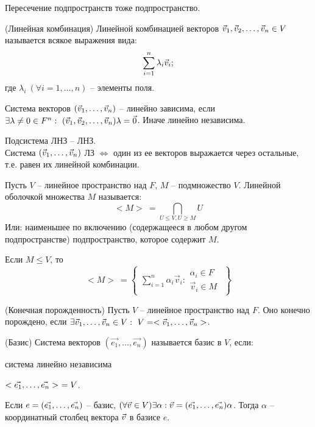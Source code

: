 \begin{multicols}{2}
\begin{note}{}{}
    Пересечение подпространств тоже подпространство.
\end{note}
\begin{definition}{(Линейная комбинация)}{}
    Линейной комбинацией векторов $\vec{v}_1, \vec{v}_2, \ldots, \vec{v}_n\in V$ называется всякое выражения вида:\useshortskip
    \[
        \sum\limits_{i=1}^n \lambda_i \vec{v}_i;
        \]
    где $\lambda_i \ (\forall i = 1, \ldots, n)$ -- элементы поля.
\end{definition}
Система векторов $(\vec{v}_1, \ldots, \vec{v}_n)$ -- линейно зависима, если $\exists \lambda\neq 0 \in F^n: \ (\vec{v}_1, \vec{v}_2,\ldots, \vec{v}_n)\lambda = \vec{0}$. Иначе линейно независима.\vspace*{0.5cm}

\begin{note}{}{}
    Подсистема ЛНЗ -- ЛНЗ. \\Система $(\vec{v}_1, \ldots, \vec{v}_n)$ ЛЗ $\Longleftrightarrow$ один из ее векторов выражается через остальные, т.е. равен их линейной комбинации.
\end{note}
\begin{definition}{}{}
    Пусть $V$ -- линейное пространство над $F$, $M$ -- подмножество $V$. Линейной оболочкой множества $M$ называется:\useshortskip
    \[
        <M>\ = \bigcap\limits_{U\leq V, U\geq M} U
        \]
    Или: наименьшее по включению (содержащееся в любом другом подпространстве) подпространство, которое содержит $M$.
\end{definition}
\begin{note}{}{}
    Если $M \leq V$, то \useshortskip
    \[
        <M>\ = \left\{\begin{array}{c}
            \sum\limits_{i=1}^n \alpha_i \vec{v}_i: \begin{array}{c}
                \alpha_i \in F\\
                \vec{v}_i \in M
            \end{array}
        \end{array}\right\}
        \]
\end{note}
\begin{definition}{(Конечная порожденность)}{}
    Пусть $V$ -- линейное пространство над $F$. Оно конечно порождено, если $\exists \vec{v}_1, \ldots, \vec{v}_n \in V: \ V = <\vec{v}_1, \ldots, \vec{v}_n>$.
\end{definition}
\begin{definition}{(Базис)}{}
    Система векторов $(\vec{e_1}, \ldots, \vec{e_n})$ называется базис в $V$, если:
    \begin{enumerate*}
        \item система линейно независима
        \item $<\vec{e_1}, \ldots, \vec{e_n}> \ = V$.
    \end{enumerate*}
\end{definition}
Если $e=(\vec{e_1}, \ldots, \vec{e_n})$ -- базис, $(\forall \vec{v} \in V) \exists \alpha: \vec{v} = (\vec{e_1}, \ldots, \vec{e_n})\alpha$. Тогда $\alpha$ -- координатный столбец вектора $\vec{v}$ в базисе $e$.\vspace*{0.5cm}


\end{multicols}
